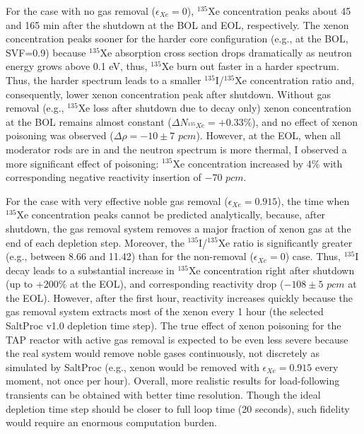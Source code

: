 For the case with no gas removal ($\epsilon_{Xe}=0$), $^{135}$Xe 
concentration peaks about 45 and 165 min after the shutdown at the 
\gls{BOL} and \gls{EOL}, respectively. The xenon concentration peaks 
sooner for the harder core configuration (e.g., at the \gls{BOL}, SVF=0.9) 
because $^{135}$Xe absorption cross section drops dramatically as neutron 
energy grows above 0.1 eV, thus, $^{135}$Xe burn out faster in a harder 
spectrum. Thus, the harder spectrum leads to a smaller $^{135}$I/$^{135}$Xe 
concentration ratio and, consequently, lower xenon concentration peak after 
shutdown. Without gas removal (e.g., $^{135}$Xe loss after 
shutdown due to decay only) xenon concentration at the \gls{BOL} remains 
almost constant ($\Delta N_{^{135}Xe}=+0.33$\%), and no effect of xenon 
poisoning was observed ($\Delta\rho=-10\pm7$ $pcm$). However, at the 
\gls{EOL}, when all moderator rods are in and the neutron spectrum is more 
thermal, I observed a more significant effect of poisoning: $^{135}$Xe 
concentration increased by 4\% with corresponding negative reactivity 
insertion of $-70$ $pcm$. 

For the case with very effective noble gas removal ($\epsilon_{Xe}=0.915$), 
the time when $^{135}$Xe concentration peaks cannot be predicted analytically, 
because, after shutdown, the gas removal system removes a major 
fraction of xenon gas at the end of each depletion step. Moreover, the 
$^{135}$I/$^{135}$Xe ratio is significantly greater (e.g., between 8.66 and 
11.42) than for the non-removal ($\epsilon_{Xe}=0$) case. Thus, $^{135}$I 
decay leads to 
a substantial increase in $^{135}$Xe concentration right after shutdown (up to 
+200\% at the \gls{EOL}), and corresponding reactivity drop ($-108\pm5$ $pcm$ 
at the \gls{EOL}). However, after the first hour, reactivity increases quickly 
because the gas removal system extracts most of the xenon every 1 hour (the 
selected SaltProc v1.0 depletion time step). The true effect of xenon 
poisoning for the \gls{TAP} reactor with active gas removal is expected to be 
even less severe because the real system would remove noble gases 
continuously, not discretely as simulated by SaltProc (e.g., xenon would be 
removed with $\epsilon_{Xe}=0.915$ every moment, not once per hour). Overall, 
more realistic results for load-following transients can be obtained with 
better time resolution. Though the ideal depletion time step should be closer 
to full loop time (20 seconds), such fidelity would require an enormous 
computation burden.

